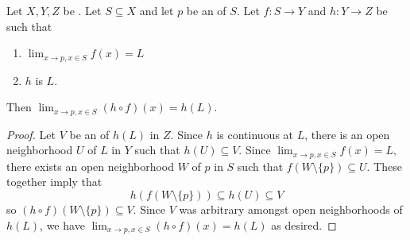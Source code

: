 \begin{proposition}  \label{proposition:continuous_function_between_topological_spaces_at_limit_point_respects_limit}
    Let $X,Y,Z$ be . Let $S \subseteq X$ and let $p$ be an  of $S$. Let $f: S \to Y$ and $h: Y \to Z$ be  such that
    \begin{enumerate}
        \item $\lim_{x \to p, x \in S} f(x) = L$
        \item $h$ is  $L$.
    \end{enumerate}
    Then $\lim_{x \to p, x \in S} (h \circ f)(x) = h(L)$.
\end{proposition}
\begin{proof}
    Let $V$ be an  of $h(L)$ in $Z$. Since $h$ is continuous at $L$, there is an open neighborhood $U$ of $L$ in $Y$ such that $h(U) \subseteq V$. Since $\lim_{x \to p, x \in S} f(x) = L$, there exists an open neighborhood $W$ of $p$ in $S$ such that $f(W \setminus \{p\}) \subseteq U$. These together imply that
    $$h(f(W \setminus \{p\})) \subseteq h(U) \subseteq V$$
    so $(h \circ f)(W \setminus \{p\}) \subseteq V$. Since $V$ was arbitrary amongst open neighborhoods of $h(L)$, we have $\lim_{x \to p, x \in S} (h \circ f)(x) = h(L)$ as desired.
\end{proof}